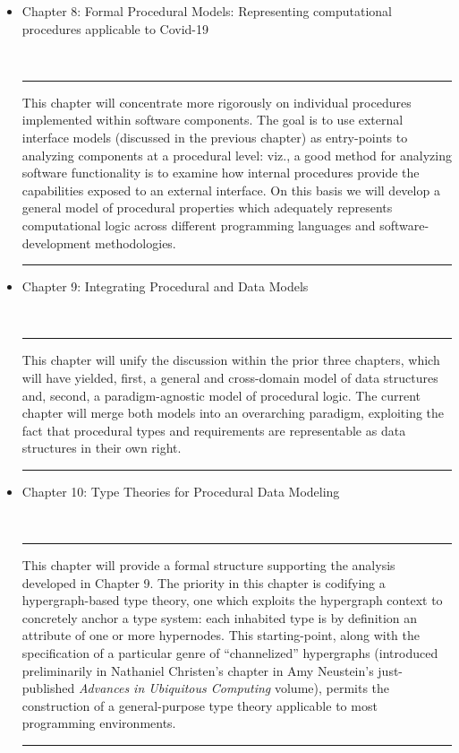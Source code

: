 \documentclass{statsoc}
\newcommand{\q}[1]{{\fontfamily{qcr}\selectfont ``}#1{\fontfamily{qcr}\selectfont ''}}
\newenvironment{summary}{\\\vspace{-4pt}%
%
%
\noindent\hfil\textcolor{rgrey!50!purple}{\rule{0.5\textwidth}{.4pt}}\hfil

\hspace{-2cm}\begin{minipage}{1.02\textwidth}\fontfamily{phv}\fontsize{9}{11}\selectfont}%
{\\\vspace{-1em}\end{minipage}
{\begin{center}\textcolor{rgrey!50!yellow}{\rule{0.5\textwidth}{.4pt}}\end{center}}
\vspace{2em}}%
\begin{document}
{\begin{description}
\begin{itemize}
\item Chapter 8: Formal Procedural Models: Representing 
computational procedures applicable to Covid-19

\begin{summary}
This chapter will concentrate more rigorously on individual 
procedures implemented within software components.  
The goal is to use external interface models (discussed 
in the previous chapter) as entry-points to analyzing 
components at a procedural level: viz., a good method for 
analyzing software functionality is to examine how 
internal procedures provide the capabilities exposed 
to an external interface.  On this basis we will 
develop a general model of procedural properties 
which adequately represents computational logic 
across different programming languages and 
software-development methodologies.   
\end{summary}

\item Chapter 9: Integrating Procedural and Data Models

\begin{summary}
This chapter will unify the discussion within the prior 
three chapters, which will have yielded, first, a 
general and cross-domain model of data structures and, 
second, a paradigm-agnostic model of procedural logic.  
The current chapter will merge both models into an 
overarching paradigm, exploiting the fact that 
procedural types and requirements are representable 
as data structures in their own right. 
\end{summary}

\item Chapter 10: Type Theories for Procedural Data Modeling

\begin{summary}
This chapter will provide a formal structure supporting 
the analysis developed in Chapter 9.  The priority 
in this chapter is codifying a hypergraph-based 
type theory, one which exploits the hypergraph context 
to concretely anchor a type system: each inhabited 
type is by definition an attribute of one or more 
hypernodes.  This starting-point, along with the 
specification of a particular genre of 
\q{channelized} hypergraphs (introduced preliminarily in 
Nathaniel Christen's chapter in Amy Neustein's 
just-published \textit{Advances in Ubiquitous Computing} 
volume), permits the construction of a general-purpose 
type theory applicable to most programming environments.  
\end{summary}


\end{itemize}
\end{description}}
\end{document}
